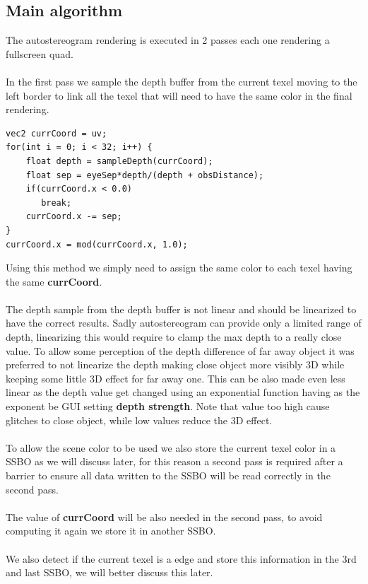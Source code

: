 \documentclass[12pt, a4paper]{article}
\begin{document}
\subsection{Main algorithm}
The autostereogram rendering is executed in 2 passes each one rendering a fullscreen quad.\\\\
In the first pass we sample the depth buffer from the current texel moving to the left border to link
all the texel that will need to have the same color in the final rendering.
\begin{lstlisting}[caption={Autostereogram depth sampling},captionpos=b]
vec2 currCoord = uv;
for(int i = 0; i < 32; i++) {
    float depth = sampleDepth(currCoord);
    float sep = eyeSep*depth/(depth + obsDistance);
    if(currCoord.x < 0.0)
       break;
    currCoord.x -= sep;
}
currCoord.x = mod(currCoord.x, 1.0);
\end{lstlisting}
Using this method we simply need to assign the same color to each texel having the same \textbf{currCoord}.\\\\
The depth sample from the depth buffer is not linear and should be linearized to have the correct results.
Sadly autostereogram can provide only a limited range of depth, linearizing this would require to clamp the max depth
to a really close value. To allow some perception of the depth difference of far away object it was preferred to not linearize
the depth making close object more visibly 3D while keeping some little 3D effect for far away one. This can be also made even less linear
as the depth value get changed using an exponential function having as the exponent be GUI setting \textbf{depth strength}. Note that value too high
cause glitches to close object, while low values reduce the 3D effect.\\\\
To allow the scene color to be used we also store the current texel color in a SSBO as we will discuss later, for this
reason a second pass is required after a barrier to ensure all data written to the SSBO will be read correctly in the second pass.\\\\
The value of \textbf{currCoord} will be also needed in the second pass, to avoid computing it again we store it in another SSBO.\\\\
We also detect if the current texel is a edge and store this information in the 3rd and last SSBO, we will better discuss this later.
\end{document}
